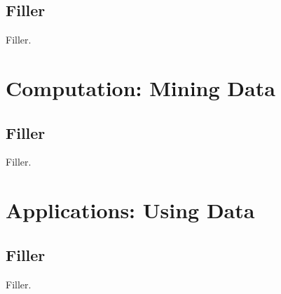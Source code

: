 \documentclass{book}
\begin{document}
\chapter{Filler}
Filler.


\part{Computation: Mining Data}
\label{part:computation}

\chapter{Filler}
Filler.

\setcounter{chapter}{12}

\part{Applications: Using Data}
\label{part:applications}

\chapter{Filler}
Filler.




\appendix


\end{document}
